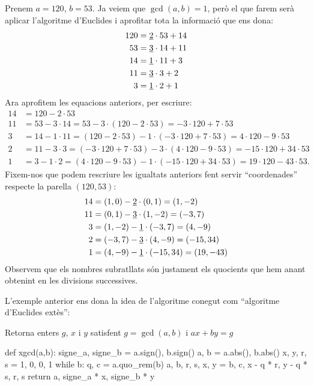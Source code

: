  \begin{example}
 Prenem $a=120$, $b = 53$. Ja veiem que $\gcd(a,b)=1$, però el que farem serà aplicar l'algoritme d'Euclides i aprofitar tota la informació que ens dona:
 \begin{align*}
120 &= \underline 2\cdot 53 + 14\\
53 & = \underline 3\cdot 14 + 11\\
14 &= \underline 1 \cdot 11 + 3\\
11 &= \underline 3\cdot 3 + 2\\
3 &= \underline 1\cdot 2 + 1\\
 \end{align*}
 Ara aprofitem les equacions anteriors, per escriure:
 \begin{align*}
 14 &= 120 - 2\cdot 53\\
 11 &= 53 - 3\cdot 14 = 53 - 3\cdot(120 - 2\cdot 53) = -3\cdot 120 + 7\cdot 53\\
 3 &= 14 - 1\cdot 11 = (120 - 2\cdot 53) -1\cdot(-3\cdot 120 +7\cdot 53) = 4\cdot 120 -9\cdot 53\\
 2 &= 11 - 3\cdot 3 = (-3\cdot 120 + 7\cdot 53) - 3\cdot (4\cdot 120 - 9\cdot 53) = -15\cdot 120 + 34\cdot 53\\
 1 &= 3 - 1\cdot 2 = (4\cdot 120 - 9\cdot 53) - 1\cdot(-15\cdot 120 + 34\cdot 53) = 19\cdot 120 - 43\cdot 53.
 \end{align*}
 Fixem-nos que podem rescriure les igualtats anteriors fent servir ``coordenades'' respecte la parella $(120, 53)$:
 \begin{align*}
     14 &= (1,0) - \underline{2}\cdot (0,1) = (1,-2)\\
     11 &= (0,1) - \underline{3}\cdot (1,-2) = (-3,7)\\
     3 &=  (1,-2) - \underline{1}\cdot(-3,7) = (4,-9)\\
     2 &= (-3,7) - \underline{3}\cdot(4,-9) = (-15,34)\\
     1 &= (4,-9) - \underline{1}\cdot(-15,34) = (19,-43)
 \end{align*}
 Observem que els nombres subratllats són justament els quocients que hem anant obtenint en les divisions successives.
 \end{example}
 L'exemple anterior ens dona la idea de l'algoritme conegut com ``algoritme d'Euclides extès'':
 \begin{algorithm}
 \caption{Retorna enters $g$, $x$ i $y$ satisfent $g=\gcd(a,b)$ i $ax+by=g$}
 \begin{python}
 def xgcd(a,b):
    signe_a, signe_b = a.sign(), b.sign()
    a, b = a.abs(), b.abs()
    x, y, r, s = 1, 0, 0, 1
    while b:
        q, c = a.quo_rem(b)
        a, b, r, s, x, y = b, c, x - q * r, y - q * s, r, s
    return a, signe_a * x, signe_b * y
 \end{python}
 \end{algorithm}
 

